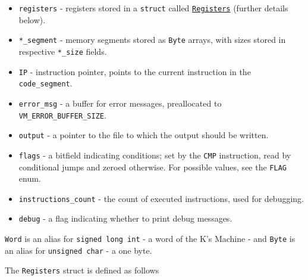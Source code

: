 \documentclass[12pt,a4paper]{paper}
\newcommand{\code}[1]{\texttt{#1}}
\newenvironment{note}[1]{\begin{notes}\item #1}{\end{notes}}
\begin{document}
\begin{itemize}
    \item \code{registers} - registers stored in a \code{struct} called
        \hyperlink{registers}{\code{Registers}} (further details below). 
    \item \code{*_segment} - memory segments stored as \code{Byte} arrays, with
        sizes stored in respective \code{*_size} fields.
    \item \code{IP} - instruction pointer, points to the current instruction in
        the \code{code_segment}.
    \item \code{error_msg} - a buffer for error messages, preallocated to
        \code{VM_ERROR_BUFFER_SIZE}.
    \item \code{output} - a pointer to the file to which the output should be
        written.
    \item \code{flags} - a bitfield indicating conditions; set by the \code{CMP}
        instruction, read by conditional jumps and zeroed otherwise. For
        possible values, see the \code{FLAG} enum.
    \item \code{instructions_count} - the count of executed instructions, used
        for debugging.
    \item \code{debug} - a flag indicating whether to print debug messages.
\end{itemize}

\begin{note}
\code{Word} is an alias for \code{signed long int} - a word of the K's Machine - and
\code{Byte} is an alias for \code{unsigned char} - a one byte.
\end{note}

The \hypertarget{registers}{\code{Registers}} struct is defined as follows 

\begin{center}
\end{center}
\end{document}
